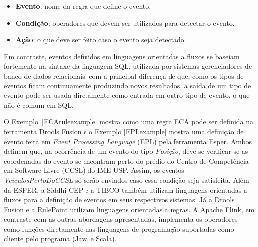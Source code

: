 \begin{itemize}
\item \textbf{Evento}: nome da regra que define o evento. 
\item \textbf{Condição}: operadores que devem ser utilizados para detectar o evento. 
\item \textbf{Ação}: o que deve ser feito caso o evento seja detectado. 
\end{itemize} 



Em contraste, eventos definidos em linguagens orientadas a fluxos se baseiam fortemente na sintaxe da linguagem SQL, utilizada por sistemas gerenciadores de banco de dados  relacionais, com a principal diferença de que, como os tipos de eventos ficam continuamente produzindo novos resultados, a saída de um tipo de evento pode ser usada diretamente como entrada em outro tipo de evento, o que não é comum em SQL.




O Exemplo~\ref{ECAruleexample} mostra como uma regra ECA pode ser definida na ferramenta Drools Fusion e o Exemplo \ref{EPLexample} mostra uma definição de evento feita em \textit{Event Processing Language} (EPL) pela ferramenta Esper. Ambos definem que, na ocorrência de um evento do tipo \textit{Posição}, deve-se  verificar se as coordenadas do evento se encontram perto do prédio do Centro de Competência em Software Livre (CCSL) do IME-USP. Assim, os eventos \textit{VeículosPertoDoCCSL} só serão enviados caso essa condição seja satisfeita.
Além da ESPER, a Siddhi CEP e a TIBCO também utilizam linguagens orientadas a fluxos para a definição de eventos em seus respectivos sistemas. Já a Drools Fusion e a RulePoint utilizam linguagens orientadas a regras. 
A Apache Flink, em contraste com as outras abordagens apresentadas, implementa os operadores como funções diretamente nas linguagens de programação suportadas como cliente pelo programa (Java e Scala). %


